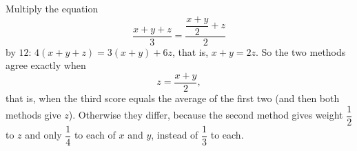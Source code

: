 Multiply the equation
\[\dfrac{x+y+z}{3}=\dfrac{\dfrac{x+y}{2}+z}{2}\]
by $12$: $4(x+y+z)=3(x+y)+6z$, that is, $x+y=2z$. So the two methods agree exactly when
\[\boxed{z=\dfrac{x+y}{2}},\]
that is, when the third score equals the average of the first two (and then both methods give $z$). Otherwise they differ, because the second method gives weight $\dfrac12$ to $z$ and only $\dfrac14$ to each of $x$ and $y$, instead of $\dfrac13$ to each.

